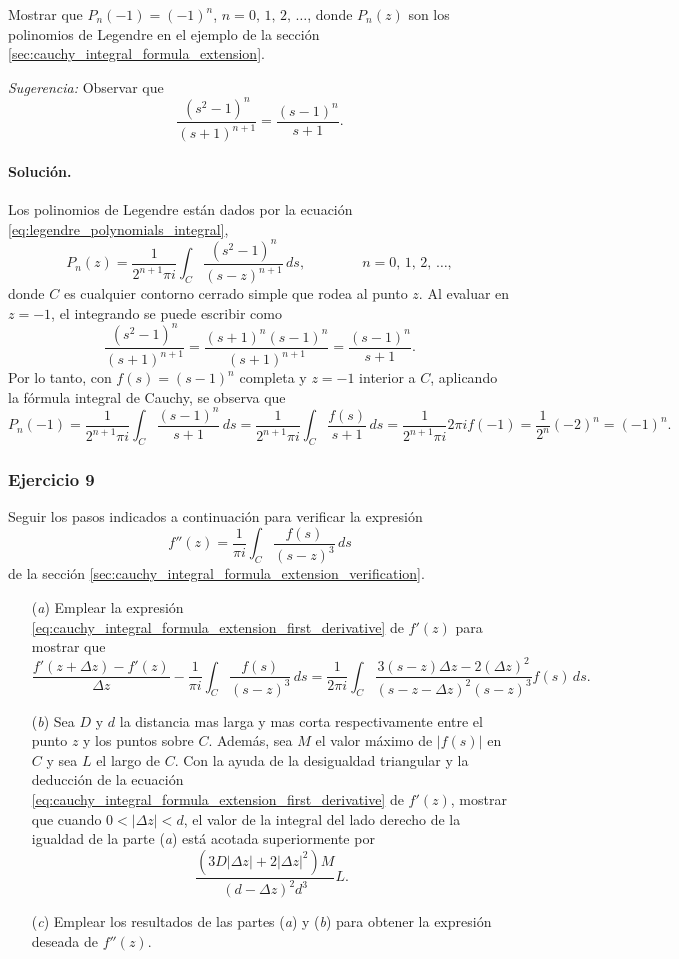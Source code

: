 \documentclass[a4paper]{report}
\begin{document}
Mostrar que \(P_n(-1)=(-1)^n\), \(n=0,\,1,\,2,\,\dots\), donde \(P_n(z)\) son los polinomios de Legendre en el ejemplo de la sección \ref{sec:cauchy_integral_formula_extension}.

\emph{Sugerencia:} Observar que 
\[
 \frac{(s^2-1)^n}{(s+1)^{n+1}}=\frac{(s-1)^n}{s+1}.
\]

\paragraph{Solución.} Los polinomios de Legendre están dados por la ecuación \ref{eq:legendre_polynomials_integral},
\[
 P_n(z)=\frac{1}{2^{n+1}\pi i}\int_{C}\frac{(s^2-1)^n}{(s-z)^{n+1}}\,ds,
 \qquad\qquad 
 n=0,\,1,\,2,\,\dots,
\]
donde \(C\) es cualquier contorno cerrado simple que rodea al punto \(z\). Al evaluar en \(z=-1\), el integrando se puede escribir como
\[
 \frac{(s^2-1)^n}{(s+1)^{n+1}}=\frac{(s+1)^n(s-1)^n}{(s+1)^{n+1}}=\frac{(s-1)^n}{s+1}.
\]
Por lo tanto, con \(f(s)=(s-1)^n\) completa y \(z=-1\) interior a \(C\), aplicando la fórmula integral de Cauchy, se observa que
\[
 P_n(-1)=\frac{1}{2^{n+1}\pi i}\int_{C}\frac{(s-1)^n}{s+1}\,ds=\frac{1}{2^{n+1}\pi i}\int_{C}\frac{f(s)}{s+1}\,ds
 =\frac{1}{2^{n+1}\pi i}2\pi if(-1)=\frac{1}{2^n}(-2)^n=(-1)^n.
\]

\subsubsection*{Ejercicio 9}

Seguir los pasos indicados a continuación para verificar la expresión 
\[
 f''(z)=\frac{1}{\pi i}\int_C\frac{f(s)}{(s-z)^3}\,ds
\]
de la sección \ref{sec:cauchy_integral_formula_extension_verification}.
\begin{enumerate}
 \item[(\textit{a})] Emplear la expresión \ref{eq:cauchy_integral_formula_extension_first_derivative} de \(f'(z)\) para mostrar que 
 \begin{equation}\label{eq:exercise_57_09_tmp2}
  \frac{f'(z+\Delta z)-f'(z)}{\Delta z}-\frac{1}{\pi i}\int_C\frac{f(s)}{(s-z)^3}\,ds
  =\frac{1}{2\pi i}\int_C\frac{3(s-z)\Delta z-2(\Delta z)^2}{(s-z-\Delta z)^2(s-z)^3}f(s)\,ds.
 \end{equation}
 \item[(\textit{b})] Sea \(D\) y \(d\) la distancia mas larga y mas corta respectivamente entre el punto \(z\) y los puntos sobre \(C\). Además, sea \(M\) el valor máximo de \(|f(s)|\) en \(C\) y sea \(L\) el largo de \(C\). Con la ayuda de la desigualdad triangular y la deducción de la ecuación \ref{eq:cauchy_integral_formula_extension_first_derivative} de \(f'(z)\), mostrar que cuando \(0<|\Delta z|<d\), el valor de la integral del lado derecho de la igualdad de la parte (\textit{a}) está acotada superiormente por 
 \[
  \frac{(3D|\Delta z|+2|\Delta z|^2)M}{(d-\Delta z)^2d^3}L.
 \]
 \item[(\textit{c})] Emplear los resultados de las partes (\textit{a}) y (\textit{b}) para obtener la expresión deseada de \(f''(z)\).
\end{enumerate}
\end{document}
